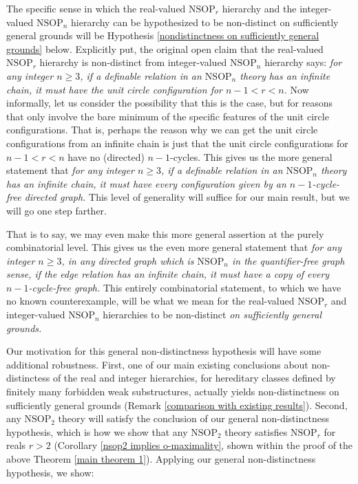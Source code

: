 \documentclass{amsart}
\theoremstyle{definition}
\theoremstyle{remark}
\numberwithin{equation}{section}
\begin{document}
The specific sense in which the real-valued $\mathrm{NSOP}_{r}$ hierarchy and the integer-valued $\mathrm{NSOP}_{n}$ hierarchy can be hypothesized to be non-distinct on sufficiently general grounds will be Hypothesis \ref{nondistinctness on sufficiently general grounds} below. Explicitly put, the original open claim that the real-valued $\mathrm{NSOP}_{r}$ hierarchy is non-distinct from integer-valued $\mathrm{NSOP}_{n}$ hierarchy says: \textit{for any integer $n \geq 3$, if a definable relation in an $\mathrm{NSOP}_{n}$ theory has an infinite chain, it must have the unit circle configuration for $n-1< r< n$.} Now informally, let us consider the possibility that this is the case, but for reasons that only involve the bare minimum of the specific features of the unit circle configurations. That is, perhaps the reason why we can get the unit circle configurations from an infinite chain is just that the unit circle configurations for $n-1 < r < n$ have no (directed) $n-1$-cycles. This gives us the more general statement that \textit{for any integer $n \geq 3$, if a definable relation in an $\mathrm{NSOP}_{n}$ theory has an infinite chain, it must have every configuration given by an $n-1$-cycle-free directed graph.} This level of generality will suffice for our main result, but we will go one step farther.

That is to say, we may even make this more general assertion at the purely combinatorial level. This gives us the even more general statement that \textit{for any integer $n \geq 3$, in any directed graph which is $\mathrm{NSOP}_{n}$ in the quantifier-free graph sense, if the edge relation has an infinite chain, it must have a copy of every $n - 1$-cycle-free graph.} This entirely combinatorial statement, to which we have no known counterexample, will be what we mean for the real-valued $\mathrm{NSOP}_{r}$ and integer-valued $\mathrm{NSOP}_{n}$ hierarchies to be non-distinct \textit{on sufficiently general grounds.}

Our motivation for this general non-distinctness hypothesis will have some additional robustness. First, one of our main existing conclusions about non-distinctess of the real and integer hierarchies, for hereditary classes defined by finitely many forbidden weak substructures, actually yields non-distinctness on sufficiently general grounds (Remark \ref{comparison with existing results}). Second, any $\mathrm{NSOP}_{2}$ theory will satisfy the conclusion of our general non-distinctness hypothesis, which is how we show that any $\mathrm{NSOP}_{2}$ theory satisfies $\mathrm{NSOP}_{r}$ for reals $r > 2$ (Corollary \ref{nsop2 implies o-maximality}, shown within the proof of the above Theorem \ref{main theorem 1}). Applying our general non-distinctness hypothesis, we show:
\end{document}
